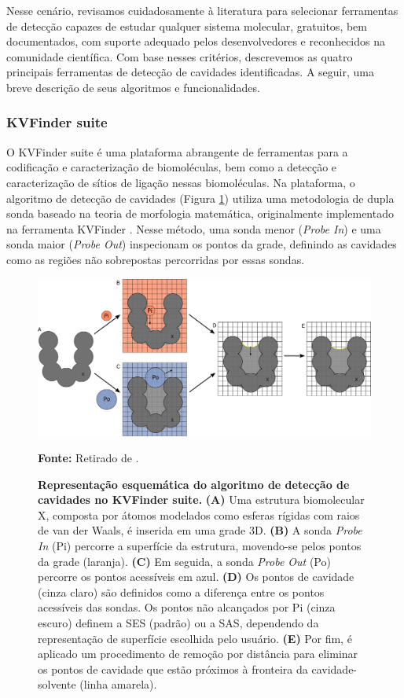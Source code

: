 \documentclass[Portugues]{phdquali}
\begin{document}
Nesse cenário, revisamos cuidadosamente à literatura para selecionar ferramentas de detecção capazes de estudar qualquer sistema molecular, gratuitos, bem documentados, com suporte adequado pelos desenvolvedores e reconhecidos na comunidade científica. Com base nesses critérios, descrevemos as quatro principais ferramentas de detecção de cavidades identificadas. A seguir, uma breve descrição de seus algoritmos e funcionalidades.

\subsubsection{KVFinder suite}

O KVFinder suite é uma plataforma abrangente de ferramentas para a codificação e caracterização de biomoléculas, bem como a detecção e caracterização de sítios de ligação nessas biomoléculas. Na plataforma, o algoritmo de detecção de cavidades (Figura \ref{fig:kvfinder-suite-schema}) utiliza uma metodologia de dupla sonda baseado na teoria de morfologia matemática, originalmente implementado na ferramenta KVFinder \cite{oliveira2014}. Nesse método, uma sonda menor (\textit{Probe In}) e uma sonda maior (\textit{Probe Out}) inspecionam os pontos da grade, definindo as cavidades como as regiões não sobrepostas percorridas por essas sondas. 

\begin{figure}[ht]
  \centerline{\includegraphics[scale=0.65]{images/kvfinder-suite-schema.png}}
  \centerline{\scriptsize{\textbf{Fonte:} Retirado de \cite{guerra2023B}.}}
  \caption[Representação esquemática do algoritmo de detecção de cavidades no KVFinder suite]{\textbf{Representação esquemática do algoritmo de detecção de cavidades no KVFinder suite.} \textbf{(A)} Uma estrutura biomolecular X, composta por átomos modelados como esferas rígidas com raios de van der Waals, é inserida em uma grade 3D. \textbf{(B)} A sonda \textit{Probe In} (Pi) percorre a superfície da estrutura, movendo-se pelos pontos da grade (laranja). \textbf{(C)} Em seguida, a sonda \textit{Probe Out} (Po) percorre os pontos acessíveis em azul. \textbf{(D)} Os pontos de cavidade (cinza claro) são definidos como a diferença entre os pontos acessíveis das sondas. Os pontos não alcançados por Pi (cinza escuro) definem a SES (padrão) ou a SAS, dependendo da representação de superfície escolhida pelo usuário. \textbf{(E)} Por fim, é aplicado um procedimento de remoção por distância para eliminar os pontos de cavidade que estão próximos à fronteira da cavidade-solvente (linha amarela).}
  \label{fig:kvfinder-suite-schema}
\end{figure}
\end{document}
